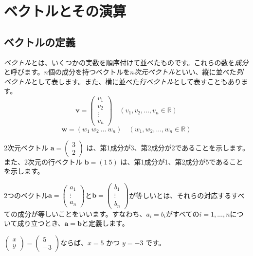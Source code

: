 \section{ベクトルとその演算}

\subsection{ベクトルの定義}

\emph{ベクトル}とは、いくつかの実数を順序付けて並べたものです。これらの数を\emph{成分}と呼びます。$n$個の成分を持つベクトルを\emph{$n$次元ベクトル}といい、縦に並べた\emph{列ベクトル}として表します。また、横に並べた\emph{行ベクトル}として表すこともあります。
\[\bm{v} = \begin{pmatrix} v_1 \\ v_2 \\ \vdots \\ v_n \end{pmatrix} \quad (v_1, v_2,\ldots,v_n\in\mathbb{R})\]
\[\bm{w} = (w_1 \ w_2 \ \dots \ w_n) \quad (w_1, w_2,\ldots,w_n\in\mathbb{R})\]

\begin{ex}
2次元ベクトル $\bm{a} = \begin{pmatrix} 3 \\ 2 \end{pmatrix}$ は、第1成分が3、第2成分が2であることを示します。
また、2次元の行ベクトル $\bm{b} = (1 \ 5)$ は、第1成分が1、第2成分が5であることを示します。
\end{ex}

\begin{dfn}[ベクトルの等しさ] \label{vector_equality}
2つのベクトル$\bm{a}=\begin{pmatrix} a_1 \\ \vdots \\ a_n \end{pmatrix}$と$\bm{b}=\begin{pmatrix} b_1 \\ \vdots \\ b_n \end{pmatrix}$が等しいとは、それらの対応するすべての成分が等しいことをいいます。すなわち、$a_i=b_i$がすべての$i=1,\ldots,n$について成り立つとき、$\bm{a}=\bm{b}$と定義します。
\end{dfn}

\begin{ex}
$\begin{pmatrix} x \\ y \end{pmatrix} = \begin{pmatrix} 5 \\ -3 \end{pmatrix}$ならば、$x=5$ かつ $y=−3$ です。
\end{ex}

